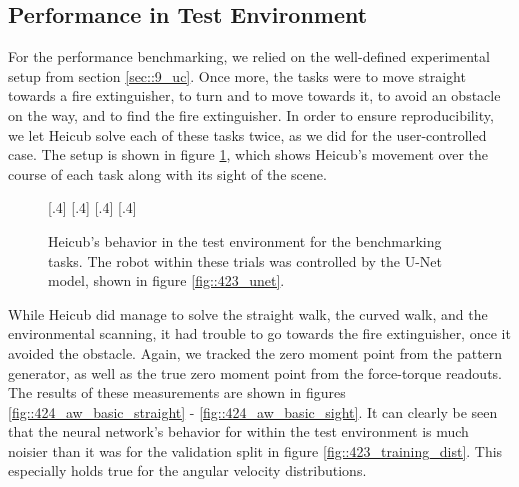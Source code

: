 \subsection{Performance in Test Environment}
\label{sec::424_pt}
For the performance benchmarking, we relied on the well-defined experimental setup from section \ref{sec::9_uc}. Once more, the tasks were to move straight towards a fire extinguisher, to turn and to move towards it, to avoid an obstacle on the way, and to find the fire extinguisher. In order to ensure reproducibility, we let Heicub solve each of these tasks twice, as we did for the user-controlled case. The setup is shown in figure \ref{fig::424_aw_gif_basic}, which shows Heicub's movement over the course of each task along with its sight of the scene.
\begin{figure}[h!]
	\centering
	[.4\linewidth]{}
	[.4\linewidth]{}
	[.4\linewidth]{}
	[.4\linewidth]{}
	\caption{Heicub's behavior in the test environment for the benchmarking tasks. The robot within these trials was controlled by the U-Net model, shown in figure \ref{fig::423_unet}.}
	\label{fig::424_aw_gif_basic}
\end{figure} 
While Heicub did manage to solve the straight walk, the curved walk, and the environmental scanning, it had trouble to go towards the fire extinguisher, once it avoided the obstacle. Again, we tracked the zero moment point from the pattern generator, as well as the true zero moment point from the force-torque readouts. The results of these measurements are shown in figures \ref{fig::424_aw_basic_straight} - \ref{fig::424_aw_basic_sight}. It can clearly be seen that the neural network's behavior for within the test environment is much noisier than it was for the validation split in figure \ref{fig::423_training_dist}. This especially holds true for the angular velocity distributions. 
